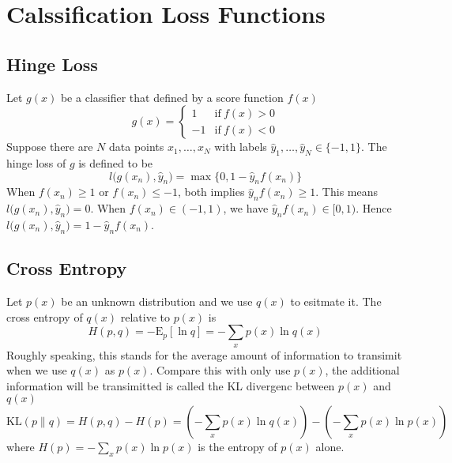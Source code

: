 \documentclass{article}
\begin{document}
    \section{Calssification Loss Functions}
        \subsection{Hinge Loss}
            Let $g(x)$ be a classifier that defined by a score function $f(x)$
            \[
                g(x) = \left\{ 
                         \begin{array}{rl}
                            1 & \mathrm{if~} f(x) > 0\\
                            -1 & \mathrm{if~} f(x) < 0
                         \end{array}
                       \right.
            \]
            Suppose there are $N$ data points $x_1,\dots,x_N$ with labels $\hat{y}_1,\dots,\hat{y}_N \in \{ -1, 1 \}$. The hinge loss of $g$ is defined to be
            \[
                l\big( g(x_n),\hat{y}_n \big) = \max\{ 0, 1 - \hat{y}_n f(x_n) \}
            \]
            When $f(x_n) \geq 1$ or $f(x_n) \leq -1$, both implies $\hat{y}_n f(x_n) \geq 1$. This means $l\big( g(x_n), \hat{y}_n \big) = 0$.
            When $f(x_n) \in (-1, 1)$, we have $\hat{y}_n f(x_n)\in [0, 1)$. Hence $l\big( g(x_n), \hat{y}_n \big) = 1 - \hat{y}_n f(x_n)$.
        \subsection{Cross Entropy}
            Let $p(x)$ be an unknown distribution and we use $q(x)$ to esitmate it. The cross entropy of $q(x)$ relative to $p(x)$ is
            \[
                H(p,q) = -\mathrm{E}_p[\ln q] = - \sum_x p(x) \ln q(x)
            \]
            Roughly speaking, this stands for the average amount of information to transimit when we use $q(x)$ as $p(x)$. Compare this with only use $p(x)$,
            the additional information will be transimitted is called the KL divergenc between $p(x)$ and $q(x)$
            \[
                \mathrm{KL}(p \| q) = H(p,q) - H(p) = \left( -\sum_x p(x) \ln q(x) \right) - \left( -\sum_x p(x) \ln p(x) \right)
            \]
            where $H(p)=-\sum_x p(x) \ln p(x)$ is the entropy of $p(x)$ alone.
\end{document}
